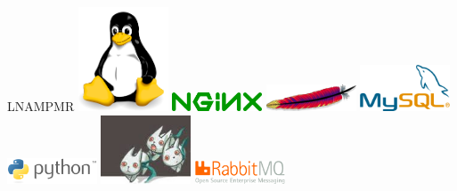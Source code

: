 \documentclass[aspectratio=169]{beamer}
\begin{document}
\begin{frame}{LNAMPMR}
\includegraphics[width=0.2\textwidth]{linux-logo.png}\hspace{0.5cm}
\includegraphics[width=0.2\textwidth]{nginx-logo.png}\hspace{0.5cm}
\includegraphics[width=0.2\textwidth]{apache-logo.png}\hspace{0.5cm}
\includegraphics[width=0.2\textwidth]{mysql-logo.png}
\vspace{0.5cm}
\includegraphics[width=0.2\textwidth]{python-logo.png}\hspace{0.5cm}
\includegraphics[width=0.2\textwidth]{memcached-logo.png}\hspace{0.5cm}
\includegraphics[width=0.2\textwidth]{rabbitmq-logo.png}\hspace{0.5cm}
\end{frame}
\end{document}
